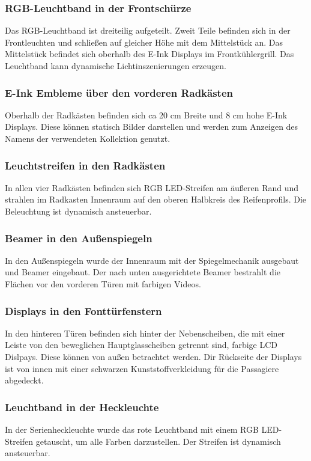 \subsubsection{RGB-Leuchtband in der Frontschürze}
Das RGB-Leuchtband ist dreiteilig aufgeteilt. Zweit Teile befinden sich in der Frontleuchten und schließen auf gleicher Höhe mit dem Mittelstück an. Das Mittelstück befindet sich oberhalb des E-Ink Displays im Frontkühlergrill. Das Leuchtband kann dynamische Lichtinszenierungen erzeugen.
\subsubsection{E-Ink Embleme über den vorderen Radkästen}
Oberhalb der Radkästen befinden sich ca 20 cm Breite und 8 cm hohe E-Ink Displays. Diese können statisch Bilder darstellen und werden zum Anzeigen des Namens der verwendeten Kollektion genutzt.
\subsubsection{Leuchtstreifen in den Radkästen}
In allen vier Radkästen befinden sich RGB LED-Streifen am äußeren Rand und strahlen im Radkasten Innenraum auf den oberen Halbkreis des Reifenprofils. Die Beleuchtung ist dynamisch ansteuerbar.
\subsubsection{Beamer in den Außenspiegeln}
In den Außenspiegeln wurde der Innenraum mit der Spiegelmechanik ausgebaut und Beamer eingebaut. Der nach unten ausgerichtete Beamer bestrahlt die Flächen vor den vorderen Türen mit farbigen Videos.
\subsubsection{Displays in den Fonttürfenstern}
In den hinteren Türen befinden sich hinter der Nebenscheiben, die mit einer Leiste von den beweglichen Hauptglasscheiben getrennt sind, farbige LCD Dislpays. Diese können von außen betrachtet werden. Dir Rückseite der Displays ist von innen mit einer schwarzen Kunststoffverkleidung für die Passagiere abgedeckt.
\subsubsection{Leuchtband in der Heckleuchte}
In der Serienheckleuchte wurde das rote Leuchtband mit einem RGB LED-Streifen getauscht, um alle Farben darzustellen. Der Streifen ist dynamisch ansteuerbar.
